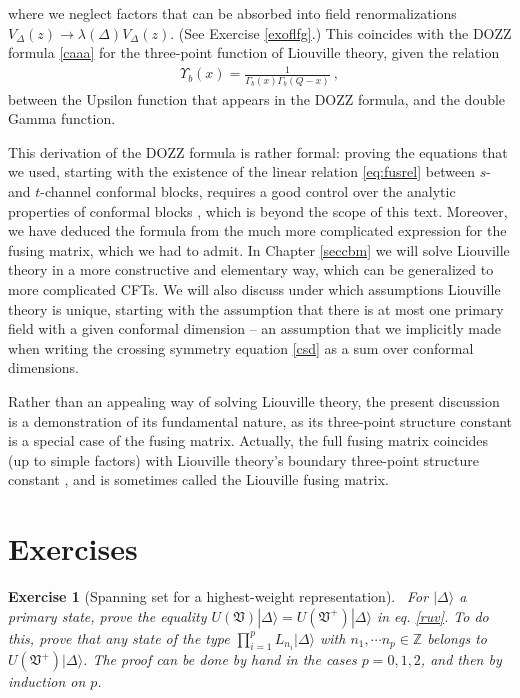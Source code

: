 \documentclass[12pt, a4paper, notitlepage, twoside]{report}
\numberwithin{equation}{section}
\theoremstyle{break}
\newtheorem{exo}{Exercise}[chapter]
\begin{document}
where we neglect factors that can be absorbed into field renormalizations $V_{\Delta}(z)\to \lambda(\Delta)V_\Delta(z)$. (See Exercise \ref{exoflfg}.) This  coincides with the DOZZ formula \eqref{caaa} for the three-point function of Liouville theory, given the relation 
\begin{align}
 \Upsilon_b(x) = \frac{1}{\Gamma_b(x)\Gamma_b(Q-x)}\ ,
 \label{eq:upga}
\end{align}
between the Upsilon function that appears in the DOZZ formula, and the double Gamma function.

This derivation of the DOZZ formula is rather formal: proving the equations that we used, starting with the existence of the linear  relation \eqref{eq:fusrel} between $s$- and $t$-channel conformal blocks, requires a good control over the analytic properties of conformal blocks \cite{tv12}, which is beyond the scope of this text. Moreover, we have deduced the formula from the much more complicated expression for the fusing matrix, which we had to admit. In Chapter \ref{seccbm} we will solve Liouville theory in a more constructive and elementary way, which can be generalized to more complicated CFTs. We will also discuss under which assumptions Liouville theory is unique, starting with the assumption that there is at most one primary field with a given conformal dimension -- an assumption that we implicitly made when writing the crossing symmetry equation \eqref{csd} as a sum over conformal dimensions.

Rather than an appealing way of solving Liouville theory, the present discussion is a demonstration of its fundamental nature, as its three-point structure constant is a special case of the fusing matrix. Actually, the full fusing matrix coincides (up to simple factors) with Liouville theory's boundary three-point structure constant \cite{pt01}, and is sometimes called the Liouville fusing matrix. 


\section{Exercises}

\begin{exo}[Spanning set for a highest-weight representation]
 ~\label{exospan}
For $|\Delta\rangle$ a primary state, prove the equality $U(\mathfrak{V})|\Delta\rangle =U(\mathfrak{V}^+)|\Delta\rangle$ in eq. \eqref{ruv}.
To do this, prove that any state of the type $\prod_{i=1}^p L_{n_i}|\Delta\rangle$ with $n_1,\cdots n_p\in {\mathbb{Z}}$ belongs to $U(\mathfrak{V}^+)|\Delta\rangle$.
The proof can be done by hand in the cases $p=0,1,2$, and then by induction on $p$.
\end{exo}
\end{document}
